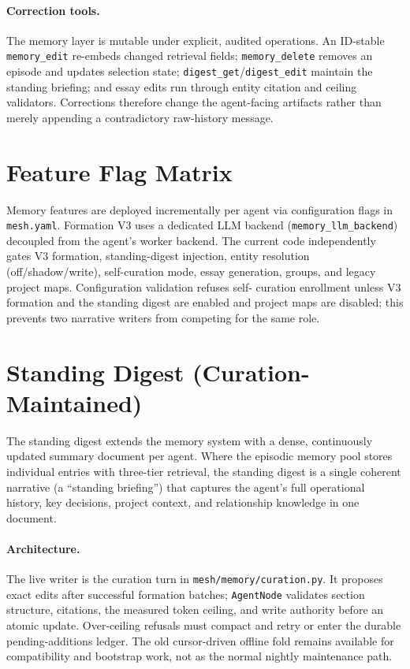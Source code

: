 \documentclass[11pt,letterpaper]{report}
\newcommand{\code}[1]{\texttt{#1}}
\begin{document}
\paragraph{Correction tools.}
The memory layer is mutable under explicit, audited operations. An
ID-stable \code{memory\_edit} re-embeds changed retrieval fields;
\code{memory\_delete} removes an episode and updates selection state;
\code{digest\_get}/\code{digest\_edit} maintain the standing briefing; and
essay edits run through entity citation and ceiling validators. Corrections
therefore change the agent-facing artifacts rather than merely appending a
contradictory raw-history message.

\section{Feature Flag Matrix}

Memory features are deployed incrementally per agent via configuration
flags in \code{mesh.yaml}. Formation V3 uses a dedicated LLM backend
(\code{memory\_llm\_backend}) decoupled from the agent's worker backend.
The current code independently gates V3 formation, standing-digest injection,
entity resolution (off/shadow/write), self-curation mode, essay generation,
groups, and legacy project maps. Configuration validation refuses self-
curation enrollment unless V3 formation and the standing digest are enabled
and project maps are disabled; this prevents two narrative writers from
competing for the same role.

\section{Standing Digest (Curation-Maintained)}
\label{sec:standing-digest}

The standing digest extends the memory system with a dense, continuously
updated summary document per agent. Where the episodic memory pool
stores individual entries with three-tier retrieval, the standing digest
is a single coherent narrative (a ``standing briefing'') that captures
the agent's full operational history, key decisions, project context, and
relationship knowledge in one document.

\paragraph{Architecture.}
The live writer is the curation turn in
\code{mesh/memory/curation.py}. It proposes exact edits after successful
formation batches; \code{AgentNode} validates section structure, citations,
the measured token ceiling, and write authority before an atomic update.
Over-ceiling refusals must compact and retry or enter the durable
pending-additions ledger. The old cursor-driven offline fold remains
available for compatibility and bootstrap work, not as the normal nightly
maintenance path.
\end{document}
